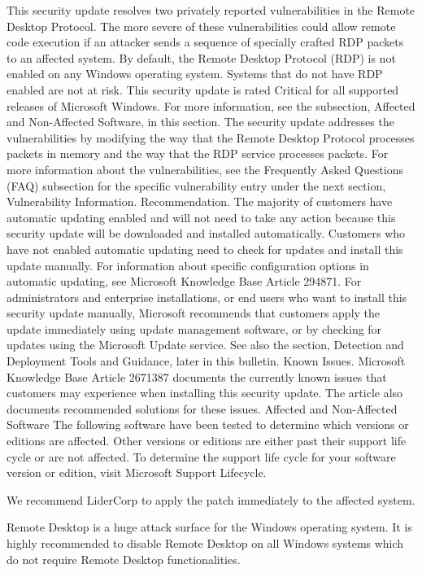 \documentclass{article}[12 pt,a4paper]
\begin{document}
This security update resolves two privately reported vulnerabilities in the Remote Desktop Protocol. The more severe of these vulnerabilities could allow remote code execution if an attacker sends a sequence of specially crafted RDP packets to an affected system. By default, the Remote Desktop Protocol (RDP) is not enabled on any Windows operating system. Systems that do not have RDP enabled are not at risk.
This security update is rated Critical for all supported releases of Microsoft Windows. For more information, see the subsection, Affected and Non-Affected Software, in this section.
The security update addresses the vulnerabilities by modifying the way that the Remote Desktop Protocol processes packets in memory and the way that the RDP service processes packets. For more information about the vulnerabilities, see the Frequently Asked Questions (FAQ) subsection for the specific vulnerability entry under the next section, Vulnerability Information.
Recommendation. The majority of customers have automatic updating enabled and will not need to take any action because this security update will be downloaded and installed automatically. Customers who have not enabled automatic updating need to check for updates and install this update manually. For information about specific configuration options in automatic updating, see Microsoft Knowledge Base Article 294871.
For administrators and enterprise installations, or end users who want to install this security update manually, Microsoft recommends that customers apply the update immediately using update management software, or by checking for updates using the Microsoft Update service.
See also the section, Detection and Deployment Tools and Guidance, later in this bulletin.
Known Issues. Microsoft Knowledge Base Article 2671387 documents the currently known issues that customers may experience when installing this security update. The article also documents recommended solutions for these issues.
Affected and Non-Affected Software
The following software have been tested to determine which versions or editions are affected. Other versions or editions are either past their support life cycle or are not affected. To determine the support life cycle for your software version or edition, visit Microsoft Support Lifecycle.

We recommend LiderCorp to apply the patch immediately to the affected system. 

Remote Desktop is a huge attack surface for the Windows operating system. It is highly recommended to disable Remote Desktop on all Windows systems which do not require Remote Desktop functionalities. 
\end{document}
